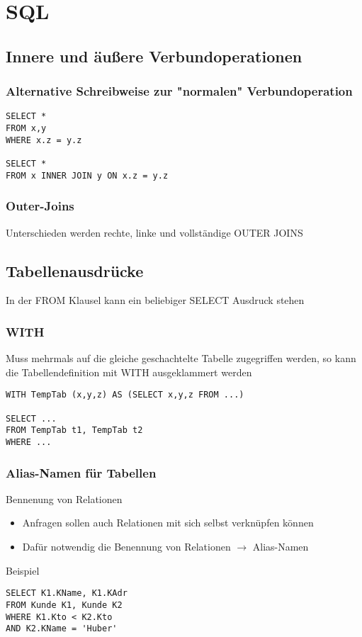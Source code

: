 \section{SQL}
\subsection{Innere und äußere Verbundoperationen}
\subsubsection{Alternative Schreibweise zur "normalen" Verbundoperation}
\begin{lstlisting}
SELECT * 
FROM x,y
WHERE x.z = y.z

SELECT *
FROM x INNER JOIN y ON x.z = y.z
\end{lstlisting}
\subsubsection{Outer-Joins}
Unterschieden werden rechte, linke und vollständige OUTER JOINS
\subsection{Tabellenausdrücke}
In der FROM Klausel kann ein beliebiger SELECT Ausdruck stehen
\subsubsection{WITH}
Muss mehrmals auf die gleiche geschachtelte Tabelle zugegriffen werden, so kann die Tabellendefinition mit WITH ausgeklammert werden
\begin{lstlisting}
WITH TempTab (x,y,z) AS (SELECT x,y,z FROM ...)

SELECT ...
FROM TempTab t1, TempTab t2
WHERE ...
\end{lstlisting}
\subsubsection{Alias-Namen für Tabellen}
Bennenung von Relationen
\begin{itemize}
	\item Anfragen sollen auch Relationen mit sich selbst verknüpfen können
	\item Dafür notwendig die Benennung von Relationen \(\to\) Alias-Namen
\end{itemize}
Beispiel
\begin{lstlisting}
SELECT K1.KName, K1.KAdr
FROM Kunde K1, Kunde K2
WHERE K1.Kto < K2.Kto
AND K2.KName = 'Huber'
\end{lstlisting}
